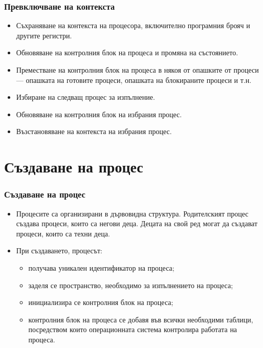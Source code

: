 \documentclass[ignorenonframetext, hyperref=unicode]{beamer}
\begin{document}
\begin{frame}\frametitle{Превключване на контекста}
\begin{itemize}
\item Съхраняване на контекста на процесора, включително програмния брояч и
другите регистри.
\item Обновяване на контролния блок на процеса и промяна на състоянието.
\item Преместване на контролния блок на процеса в някоя от опашките от процеси
--- опашката на готовите процеси, опашката на блокираните процеси и т.н.
\item Избиране на следващ процес за изпълнение.
\item Обновяване на контролния блок на избрания процес.
\item Възстановяване на контекста на избрания процес.
\end{itemize}
\end{frame}




\section{Създаване на процес}

\begin{frame}\frametitle{Създаване на процес}
\begin{itemize}
\item Процесите са организирани в дървовидна структура. Родителският процес
създава процеси, които са негови деца. Децата на свой ред могат да създават
процеси, които са техни деца.
\item При създаването, процесът:
\begin{itemize}
  \item получава уникален идентификатор на процеса;
  \item заделя се пространство, необходимо за изпълнението на процеса;
  \item инициализира се контролния блок на процеса;
  \item контролния блок на процеса се добавя във всички необходими таблици,
  посредством които операционната система контролира работата на процеса.
\end{itemize}
\end{itemize}
\end{frame}
\end{document}
